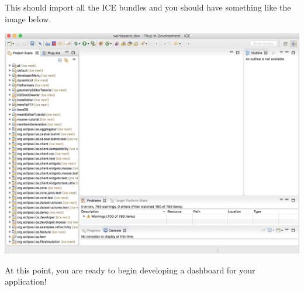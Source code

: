 This should import all the ICE bundles and you should have something
like the image below.
\begin{center} \includegraphics[width=\textwidth]{figures/cloned} \end{center}

At this point, you are ready to begin developing a dashboard for your
application!
